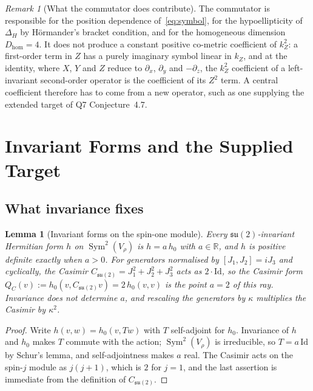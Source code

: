 \documentclass[11pt,a4paper]{article}
\newtheorem{lemma}[theorem]{Lemma}
\theoremstyle{definition}
\theoremstyle{remark}
\newtheorem{remark}[theorem]{Remark}
\DeclareMathOperator{\Sym}{Sym}
\newcommand{\Vr}{V_{\rho}}
\newcommand{\suTwo}{\mathfrak{su}(2)}
\newcommand{\Csu}{C_{\suTwo}}
\begin{document}
      \begin{remark}[What the commutator does contribute]\label{rem:commutator}
        The commutator is responsible for the position dependence of~\eqref{eq:symbol}, for the hypoellipticity of
        $\Delta_H$ by H\"ormander's bracket condition, and for the homogeneous dimension $D_{\mathrm{hom}} = 4$.
        It does not produce a constant positive co-metric coefficient of $k_Z^2$: a first-order term in $Z$ has a purely
        imaginary symbol linear in $k_Z$, and at the identity, where $X$, $Y$ and $Z$ reduce to $\partial_x$,
        $\partial_y$ and $-\partial_z$, the $k_Z^2$ coefficient of a left-invariant second-order operator is the
        coefficient of its $Z^2$ term.
        A central coefficient therefore has to come from a new operator, such as one supplying the extended target of
        Q7 Conjecture~4.7.
      \end{remark}

  \section{Invariant Forms and the Supplied Target}\label{sec:casimir}

    \subsection{What invariance fixes}

      \begin{lemma}[Invariant forms on the spin-one module]\label{lem:casimir-unique}
        Every $\suTwo$-invariant Hermitian form $h$ on $\Sym^2(\Vr)$ is $h = a\,h_0$ with $a \in \mathbb{R}$, and $h$ is
        positive definite exactly when $a > 0$.
        For generators normalised by $[J_1, J_2] = iJ_3$ and cyclically, the Casimir
        $\Csu = J_1^2 + J_2^2 + J_3^2$ acts as $2 \cdot \mathrm{Id}$, so the Casimir form
        $Q_C(v) := h_0(v, \Csu v) = 2\,h_0(v, v)$ is the point $a = 2$ of this ray.
        Invariance does not determine $a$, and rescaling the generators by $\kappa$ multiplies the Casimir by
        $\kappa^2$.
      \end{lemma}

      \begin{proof}
        Write $h(v, w) = h_0(v, Tw)$ with $T$ self-adjoint for $h_0$.
        Invariance of $h$ and $h_0$ makes $T$ commute with the action; $\Sym^2(\Vr)$ is irreducible, so
        $T = a\,\mathrm{Id}$ by Schur's lemma, and self-adjointness makes $a$ real.
        The Casimir acts on the spin-$j$ module as $j(j+1)$, which is $2$ for $j = 1$, and the last assertion is
        immediate from the definition of $\Csu$.
      \end{proof}
\end{document}

